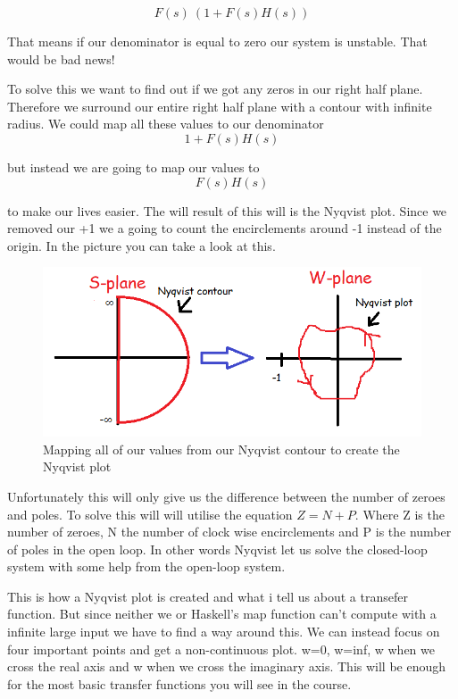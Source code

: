 \begin{equation*}
F(s) \ (1 + F(s)H(s))
\end{equation*}

That means if our denominator is equal to zero our system is unstable. That would be bad news!

To solve this we want to find out if we got any zeros in our right half plane. Therefore we surround our entire right half plane with a contour with infinite radius. We could map all these values to our denominator 
\begin{equation*}
1 + F(s)H(s)
\end{equation*}

but instead we are going to map our values to \begin{equation*}
F(s)H(s)
\end{equation*}

to make our lives easier. The will result of this will is the Nyqvist plot. Since we removed our +1 we a going to count the encirclements around -1 instead of the origin. In the picture you can take a look at this.


\begin{figure}[h!]
    \centering
    \includegraphics[scale= 0.4]{Images/nykv.PNG}
    \caption{Mapping all of our values from our Nyqvist contour to create the Nyqvist plot}
    \label{Nyqvist}
\end{figure}

Unfortunately this will only give us the difference between the number of zeroes and poles. To solve this will will utilise the equation $Z = N + P$. Where Z is the number of zeroes, N the number of clock wise encirclements and P is the number of poles in the open loop. In other words Nyqvist let us solve the closed-loop system with some help from the open-loop system.


This is how a Nyqvist plot is created and what i tell us about a transefer function. But since neither we or Haskell's map function can't compute with a infinite large input we have to find a way around this. We can instead focus on four important points and get a non-continuous plot. w=0, w=inf, w when we cross the real axis and w when we cross the imaginary axis. This will be enough for the most basic transfer functions you will see in the course.